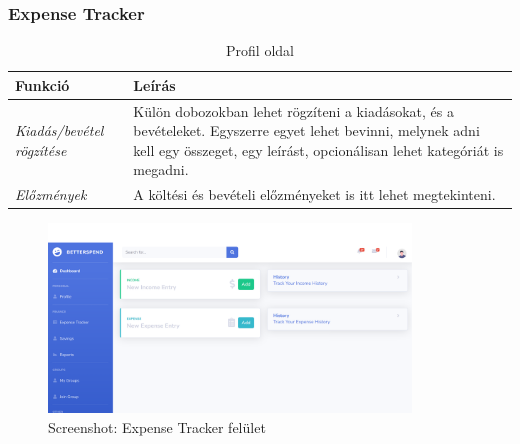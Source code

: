 \subsubsection{Expense Tracker}
\begin{table}[H]
	\centering
	\begin{tabular}{ | m{} | m{} | }
		\hline
		\textbf{Funkció} & \textbf{Leírás} \\
		\hline \hline
		\emph{Kiadás/bevétel rögzítése} & Külön dobozokban lehet rögzíteni a kiadásokat, és a bevételeket. Egyszerre egyet lehet bevinni, melynek adni kell egy összeget, egy leírást, opcionálisan lehet kategóriát is megadni. \\
		\hline
		\emph{Előzmények} &  A költési és bevételi előzményeket is itt lehet megtekinteni.  \\
		\hline
	\end{tabular}
	\caption{Profil oldal}
	\label{tab:example-1}
\end{table}

\begin{figure}[H]
	\centering
	\includegraphics[height=190px]{img/expense-tracker-screenshot}
	\caption{Screenshot: Expense Tracker felület}
	\label{fig:example-1}
\end{figure}